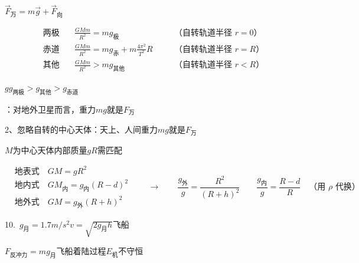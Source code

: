 
$\vec{F}_{\text{万}}=m\vec{g}+\vec{F}_{\text{向}}$

\[
\begin{aligned}
\text{两极}\quad & \frac{GMm}{R^{2}}=mg_{\text{极}} & & \quad\text{（自转轨道半径 $r=0$）}\\[4pt]
\text{赤道}\quad & \frac{GMm}{R^{2}}=mg_{\text{赤}}+m\frac{4\pi^{2}}{T^{2}}R & & \quad\text{（自转轨道半径 $r=R$）}\\[4pt]
\text{其他}\quad & \frac{GMm}{R^{2}}>mg_{\text{其他}} & & \quad\text{（自转轨道半径 $r<R$）}
\end{aligned}
\]

$g$\quad $g_{\text{两极}}>g_{\text{其他}}>g_{\text{赤道}}$\hfill{}

：对地外卫星而言，重力$mg$就是$F_{\text{万}}$

2、忽略自转的中心天体：天上、人间重力$mg$就是$F_{\text{万}}$\quad{}%

$M$为中心天体内部质量\quad $gR$需匹配

\[
\begin{aligned}
&\text{地表式}\quad GM=gR^{2}\\
&\text{地内式}\quad GM_{\text{内}}=g_{\text{内}}(R-d)^{2}\\
&\text{地外式}\quad GM=g_{\text{外}}(R+h)^{2}
\end{aligned}
\qquad\to\qquad
\frac{g_{\text{外}}}{g}=\frac{R^{2}}{(R+h)^{2}}\quad\quad
\frac{g_{\text{内}}}{g}=\frac{R-d}{R}\quad\text{（用 $\rho$ 代换）}
\]


10.\ $g_{\text{月}}=1.7\unit{m/s^2}$\quad $v=\sqrt{2g_{\text{月}}h}$\quad 飞船

$F_{\text{反冲力}}=mg_{\text{月}}$\quad 飞船着陆过程$E_{\text{机}}$不守恒


